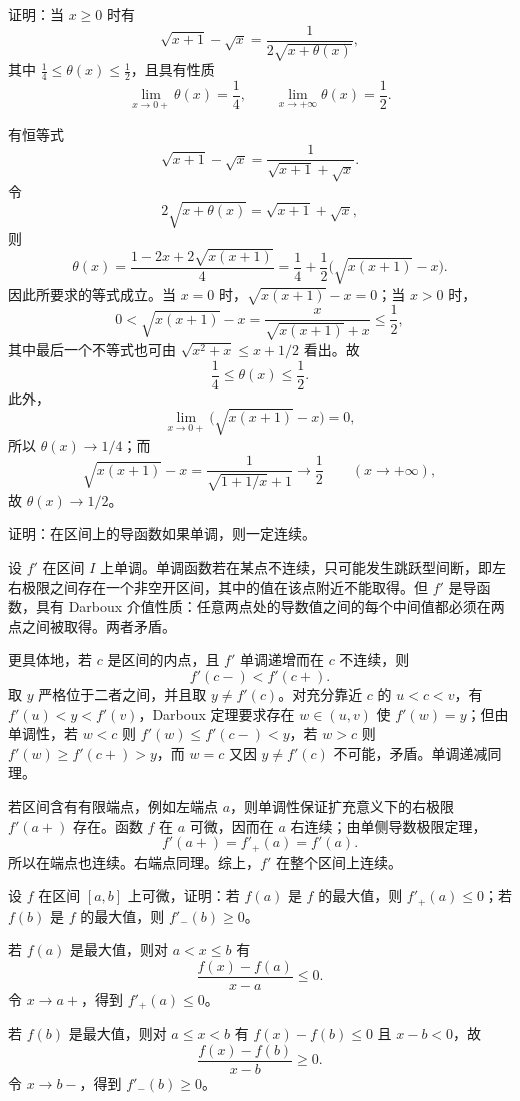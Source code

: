 \begin{xexercise}[9]
证明：当 $x\geqslant0$ 时有
\[
  \sqrt{x+1}-\sqrt{x}=\frac{1}{2\sqrt{x+\theta(x)}},
\]
其中 $\frac14\leqslant\theta(x)\leqslant\frac12$，且具有性质
\[
  \lim_{x\to0+}\theta(x)=\frac14,
  \qquad
  \lim_{x\to+\infty}\theta(x)=\frac12.
\]
\end{xexercise}
\begin{xsolution}
有恒等式
\[
  \sqrt{x+1}-\sqrt{x}
  =\frac1{\sqrt{x+1}+\sqrt{x}}.
\]
令
\[
  2\sqrt{x+\theta(x)}=\sqrt{x+1}+\sqrt{x},
\]
则
\[
  \theta(x)
  =\frac{1-2x+2\sqrt{x(x+1)}}4
  =\frac14+\frac12\bigl(\sqrt{x(x+1)}-x\bigr).
\]
因此所要求的等式成立。当 $x=0$ 时，$\sqrt{x(x+1)}-x=0$；当 $x>0$ 时，
\[
  0<\sqrt{x(x+1)}-x
  =\frac{x}{\sqrt{x(x+1)}+x}\leqslant\frac12,
\]
其中最后一个不等式也可由 $\sqrt{x^2+x}\leqslant x+1/2$ 看出。故
\[
  \frac14\leqslant\theta(x)\leqslant\frac12.
\]
此外，
\[
  \lim_{x\to0+}\bigl(\sqrt{x(x+1)}-x\bigr)=0,
\]
所以 $\theta(x)\to1/4$；而
\[
  \sqrt{x(x+1)}-x
  =\frac1{\sqrt{1+1/x}+1}\to\frac12
  \qquad(x\to+\infty),
\]
故 $\theta(x)\to1/2$。
\end{xsolution}


\begin{xexercise}[10]
证明：在区间上的导函数如果单调，则一定连续。
\end{xexercise}
\begin{xsolution}
设 $f'$ 在区间 $I$ 上单调。单调函数若在某点不连续，只可能发生跳跃型间断，即左右极限之间存在一个非空开区间，其中的值在该点附近不能取得。但 $f'$ 是导函数，具有 Darboux 介值性质：任意两点处的导数值之间的每个中间值都必须在两点之间被取得。两者矛盾。

更具体地，若 $c$ 是区间的内点，且 $f'$ 单调递增而在 $c$ 不连续，则
\[
  f'(c-)<f'(c+).
\]
取 $y$ 严格位于二者之间，并且取 $y\neq f'(c)$。对充分靠近 $c$ 的 $u<c<v$，有 $f'(u)<y<f'(v)$，Darboux 定理要求存在 $w\in(u,v)$ 使 $f'(w)=y$；但由单调性，若 $w<c$ 则 $f'(w)\leqslant f'(c-)<y$，若 $w>c$ 则 $f'(w)\geqslant f'(c+)>y$，而 $w=c$ 又因 $y\neq f'(c)$ 不可能，矛盾。单调递减同理。

若区间含有有限端点，例如左端点 $a$，则单调性保证扩充意义下的右极限 $f'(a+)$ 存在。函数 $f$ 在 $a$ 可微，因而在 $a$ 右连续；由单侧导数极限定理，
\[
  f'(a+)=f'_+(a)=f'(a).
\]
所以在端点也连续。右端点同理。综上，$f'$ 在整个区间上连续。
\end{xsolution}


\begin{xexercise}[11]
设 $f$ 在区间 $[a,b]$ 上可微，证明：若 $f(a)$ 是 $f$ 的最大值，则 $f'_+(a)\leqslant0$；若 $f(b)$ 是 $f$ 的最大值，则 $f'_-(b)\geqslant0$。
\end{xexercise}
\begin{xsolution}
若 $f(a)$ 是最大值，则对 $a<x\leqslant b$ 有
\[
  \frac{f(x)-f(a)}{x-a}\leqslant0.
\]
令 $x\to a+$，得到 $f'_+(a)\leqslant0$。

若 $f(b)$ 是最大值，则对 $a\leqslant x<b$ 有 $f(x)-f(b)\leqslant0$ 且 $x-b<0$，故
\[
  \frac{f(x)-f(b)}{x-b}\geqslant0.
\]
令 $x\to b-$，得到 $f'_-(b)\geqslant0$。
\end{xsolution}


